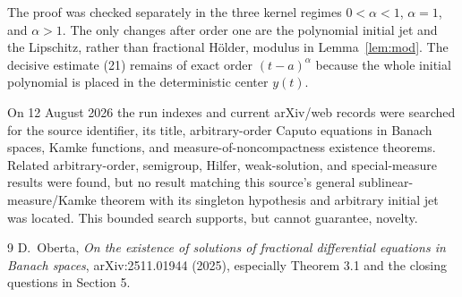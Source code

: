 \documentclass[11pt]{article}
\begin{document}
The proof was checked separately in the three kernel regimes
$0<\alpha<1$, $\alpha=1$, and $\alpha>1$.  The only changes after order one
are the polynomial initial jet and the Lipschitz, rather than fractional
Hölder, modulus in Lemma~\ref{lem:mod}.  The decisive estimate (21) remains
of exact order $(t-a)^\alpha$ because the whole initial polynomial is placed
in the deterministic center $y(t)$.

On 12 August 2026 the run indexes and current arXiv/web records were searched
for the source identifier, its title, arbitrary-order Caputo equations in
Banach spaces, Kamke functions, and measure-of-noncompactness existence
theorems.  Related arbitrary-order, semigroup, Hilfer, weak-solution, and
special-measure results were found, but no result matching this source's
general sublinear-measure/Kamke theorem with its singleton hypothesis and
arbitrary initial jet was located.  This bounded search supports, but cannot
guarantee, novelty.

\begin{thebibliography}{9}
D.~Oberta, \emph{On the existence of solutions of fractional differential
equations in Banach spaces}, arXiv:2511.01944 (2025), especially Theorem 3.1
and the closing questions in Section 5.
\end{thebibliography}
\end{document}
